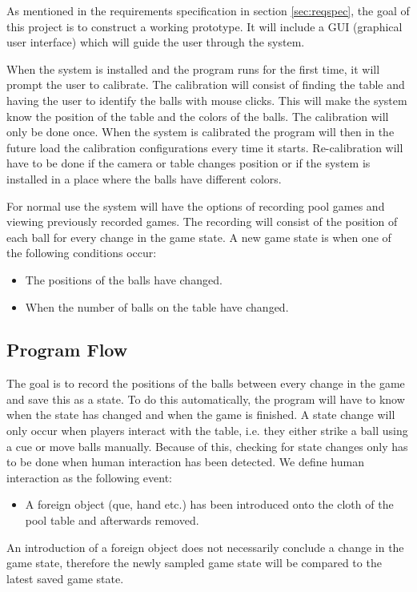 As mentioned in the requirements specification in section \ref{sec:reqspec}, the goal of this project is to construct a working prototype. It will include a GUI (graphical user interface) which will guide the user through the system.

When the system is installed and the program runs for the first time, it will prompt the user to calibrate. The calibration will consist of finding the table and having the user to identify the balls with mouse clicks. This will make the system know the position of the table and the colors of the balls. The calibration will only be done once. When the system is calibrated the program will then in the future load the calibration configurations every time it starts. Re-calibration will have to be done if the camera or table changes position or if the system is installed in a place where the balls have different colors.

For normal use the system will have the options of recording pool games and viewing previously recorded games. The recording will consist of the position of each ball for every change in the game state. A new game state is when one of the following conditions occur: 
\begin{itemize}
	\item The positions of the balls have changed.
	\item When the number of balls on the table have changed.
\end{itemize}

\subsection{Program Flow}
The goal is to record the positions of the balls between every change in the game and save this as a state. To do this automatically, the program will have to know when the state has changed and when the game is finished. A state change will only occur when players interact with the table, i.e. they either strike a ball using a cue or move balls manually. Because of this, checking for state changes only has to be done when human interaction has been detected. We define human interaction as the following event:
\begin{itemize}
	\item  A foreign object (que, hand etc.) has been introduced onto the cloth of the pool table and afterwards removed.
\end{itemize}

An introduction of a foreign object does not necessarily conclude a change in the game state, therefore the newly sampled game state will be compared to the latest saved game state.

